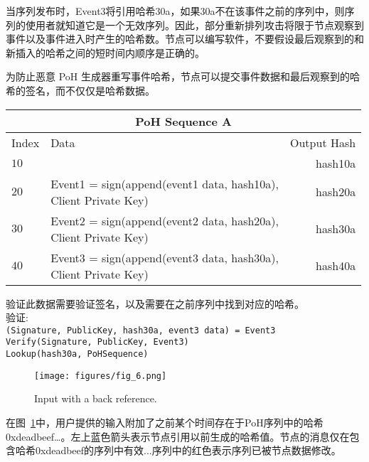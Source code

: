 \documentclass[12pt, uft8]{ctexart}
\begin{document}
当序列发布时，Event3将引用哈希30a，如果30a不在该事件之前的序列中，则序列的使用者就知道它是一个无效序列。因此，部分重新排列攻击将限于节点观察到事件以及事件进入时产生的哈希数。节点可以编写软件，不要假设最后观察到的和新插入的哈希之间的短时间内顺序是正确的。

为防止恶意 PoH 生成器重写事件哈希，节点可以提交事件数据和最后观察到的哈希的签名，而不仅仅是哈希数据。\\
\begin{center}
  \begin{tabular}{  l  l  r }
    \multicolumn{3}{c}{PoH Sequence A} \\
    \hline
    Index & Data & Output Hash \\ \hline
    $10$ & & hash10a  \\
    $20$ & \makecell{Event1 = sign(append(event1 data, hash10a), \\Client Private Key)} & hash20a\\
    $30$ & \makecell{Event2 = sign(append(event2 data, hash20a), \\Client Private Key)} & hash30a \\
    $40$ & \makecell{Event3 = sign(append(event3 data, hash30a), \\Client Private Key)} & hash40a \\

    \end{tabular}
\end{center}

验证此数据需要验证签名，以及需要在之前序列中找到对应的哈希。\\
\noindent 验证:\\

\noindent\texttt{(Signature, PublicKey, hash30a, event3 data) = Event3} \\
\texttt{Verify(Signature, PublicKey, Event3)}\\
\texttt{Lookup(hash30a, PoHSequence)}\\

\begin{figure}
  \begin{center}
    \centering
    \texttt{[image: figures/fig\_6.png]}
    \caption[Fig 6]{Input with a back reference.\label{fig:poh_consistency}}
  \end{center}
  \end{figure}

在图~\ref{fig:poh_consistency}中，用户提供的输入附加了之前某个时间存在于PoH序列中的哈希0xdeadbeef…。左上蓝色箭头表示节点引用以前生成的哈希值。节点的消息仅在包含哈希0xdeadbeef的序列中有效...序列中的红色表示序列已被节点数据修改。
\end{document}
